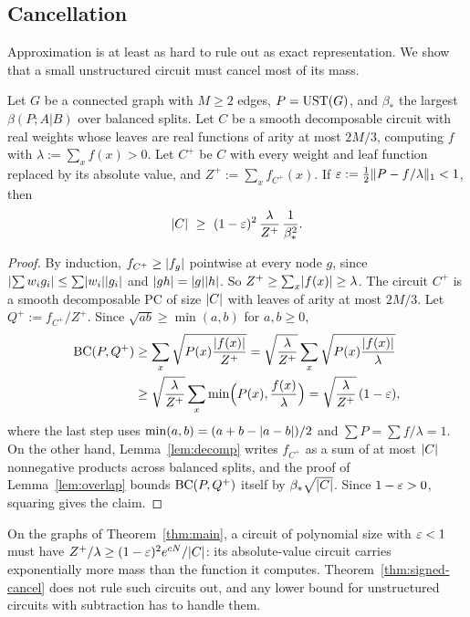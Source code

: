 \subsection{Cancellation}

Approximation is at least as hard to rule out as exact representation. We show that a small unstructured circuit must cancel most of its mass.

\begin{theorem}[cancellation]\label{thm:signed-cancel}
Let $G$ be a connected graph with $M\ge2$ edges, $P=\mathrm{UST}(G)$, and $\beta_*$ the largest $\beta(P;A|B)$ over balanced splits. Let $C$ be a smooth decomposable circuit with real weights whose leaves are real functions of arity at most $2M/3$, computing $f$ with $\lambda:=\sum_xf(x)>0$. Let $C^+$ be $C$ with every weight and leaf function replaced by its absolute value, and $Z^+:=\sum_xf_{C^+}(x)$. If $\varepsilon:=\frac12\lVert P-f/\lambda\rVert_1<1$, then
\[
  \abs C\ \ge\ (1-\eps)^2\,\frac\lambda{Z^+}\,\frac1{\beta_*^2} .
\]
\end{theorem}

\begin{proof}
By induction, $f_{C^+}\ge\lvert f_g\rvert$ pointwise at every node $g$, since $\lvert \sum w_ig_i\rvert\le\sum\lvert w_i\rvert\lvert g_i\rvert$ and $\lvert gh\rvert=\lvert g\rvert\lvert h\rvert$. So $Z^+\ge\sum_x\lvert f(x)\rvert\ge\lambda$. The circuit $C^+$ is a smooth decomposable PC of size $\lvert C\rvert$ with leaves of arity at most $2M/3$. Let $Q^+:=f_{C^+}/Z^+$. Since $\sqrt{ab}\ge\min(a,b)$ for $a,b\ge0$,
\begin{align*}
  \mathrm{BC}(P,Q^+)&\ge\sum_x\sqrt{P(x)\frac{\lvert f(x)\rvert}{Z^+}}=\sqrt{\frac\lambda{Z^+}}\sum_x\sqrt{P(x)\frac{\lvert f(x)\rvert}\lambda}\\
  &\ge\sqrt{\frac\lambda{Z^+}}\sum_x\min\Bigl(P(x),\frac{f(x)}\lambda\Bigr)=\sqrt{\frac\lambda{Z^+}}\,(1-\varepsilon),
\end{align*}
where the last step uses $\min(a,b)=(a+b-\lvert a-b\rvert)/2$ and $\sum P=\sum f/\lambda=1$. On the other hand, Lemma~\ref{lem:decomp} writes $f_{C^+}$ as a sum of at most $\lvert C\rvert$ nonnegative products across balanced splits, and the proof of Lemma~\ref{lem:overlap} bounds $\mathrm{BC}(P,Q^+)$ itself by $\beta_*\sqrt{\lvert C\rvert}$. Since $1-\varepsilon>0$, squaring gives the claim.
\end{proof}

On the graphs of Theorem~\ref{thm:main}, a circuit of polynomial size with $\varepsilon<1$ must have $Z^+/\lambda\ge(1-\varepsilon)^2e^{cN}/\lvert C\rvert$: its absolute-value circuit carries exponentially more mass than the function it computes. Theorem~\ref{thm:signed-cancel} does not rule such circuits out, and any lower bound for unstructured circuits with subtraction has to handle them.

